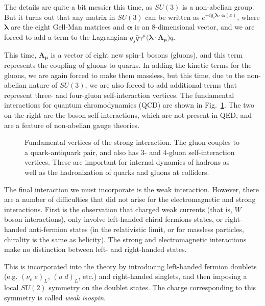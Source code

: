 The details are quite a bit messier this time, as $SU(3)$ is a non-abelian group. But it turns out
that any matrix in $SU(3)$ can be written as $e^{-ig_s\boldsymbol\lambda\cdot\boldsymbol\alpha(x)}$, where
$\boldsymbol\lambda$ are the eight Gell-Man matrices and $\boldsymbol\alpha$ is an 8-dimensional vector,
and we are forced to add a term to the Lagrangian $g_s\bar{q}\gamma^\mu\boldsymbol(\boldsymbol\lambda\cdot\mathbf{A_\mu})q$.

This time, $\mathbf{A_\mu}$ is a vector of eight new spin-1 bosons (gluons), and this term represents the coupling of gluons
to quarks. In adding the kinetic terms for the gluons, we are again forced to make them massless, but this time,
due to the non-abelian nature of $SU(3)$, we are also forced to add additional terms that represent three- and four-gluon 
self-interaction vertices. The fundamental interactions for quantum chromodynamics (QCD) are shown in Fig.~\ref{fig:strong_diagrams}.
The two on the right are the boson self-interactions, which are not present in QED, and are a feature of non-abelian
gauge theories.

\begin{figure}[t]
  \addtolength{\abovecaptionskip}{5mm}
  \centering
  \vskip5mm
  
  
  
    \caption{Fundamental vertices of the strong interaction. The gluon couples to a quark-antiquark
      pair, and also has 3- and 4-gluon self-interaction vertices. These are important for internal
      dynamics of hadrons as well as the hadronization of quarks and gluons at colliders.
            }
    \label{fig:strong_diagrams}
\end{figure}

The final interaction we must incorporate is the weak interaction. However, there are a number of difficulties
that did not arise for the electromagnetic and strong interactions. First is the observation that charged weak
currents (that is, $W$ boson interactions), only involve left-handed chiral fermions states, 
or right-handed anti-fermion states (in the relativistic
limit, or for massless particles, chirality is the same as helicity). The strong and electromagnetic
interactions make no distinction between left- and right-handed states. 

This is incorporated into the theory
by introducing left-handed fermion doublets (e.g. $(\nu_e\;e)_L$, $(u\;d)_L$, etc.) and right-handed
singlets, and then imposing a local $SU(2)$ symmetry on the doublet states. The charge corresponding
to this symmetry is called \textit{weak isospin}.

